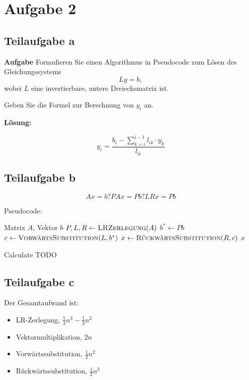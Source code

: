 \section*{Aufgabe 2}
\subsection*{Teilaufgabe a}
\textbf{Aufgabe}
Formulieren Sie einen Algorithmus in Pseudocode zum Lösen des Gleichungssystems
\[Ly = b,\]
wobei $L$ eine invertierbare, untere Dreiecksmatrix ist.

Geben Sie die Formel zur Berechnung von $y_i$ an.

\textbf{Lösung:} 

\[y_i = \frac{b_i - \sum_{k=i}^{i-1} l_{ik} \cdot y_k}{l_{ii}}\]

\subsection*{Teilaufgabe b}
\[Ax = b ? PAx = Pb ? LRx = Pb \]

Pseudocode:

   \begin{algorithm}[H]
        \begin{algorithmic}
        \Require Matrix $A$, Vektor $b$
        	\State $P, L, R \gets \Call{LRZerlegung}{A}$
			\State $b^* \gets Pb$
			\State $c \gets \Call{VorwärtsSubstitution}{L, b^*}$
			\State $x \gets \Call{RückwärtsSubstitution}{R, c}$
			\State \Return $x$
		\EndProcedure
        \end{algorithmic}
    \caption{Calculate TODO}
    \label{alg:TODO}
    \end{algorithm}

\subsection*{Teilaufgabe c}
Der Gesamtaufwand ist:
\begin{itemize}
	\item LR-Zerlegung, $\frac{1}{3}n^3 - \frac{1}{3} n^2$
	\item Vektormultiplikation, $2n$
	\item Vorwärtssubstitution, $\frac{1}{2} n^2$
	\item Rückwärtssubstitution, $\frac{1}{2} n^2$
\end{itemize}
